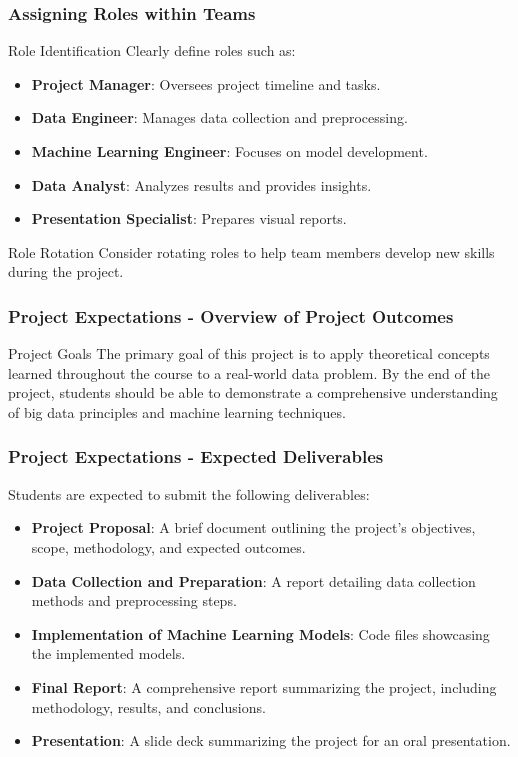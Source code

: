 \documentclass[aspectratio=169]{beamer}
\begin{document}
\begin{frame}[fragile]
    \frametitle{Assigning Roles within Teams}
    \begin{block}{Role Identification}
        Clearly define roles such as:
        \begin{itemize}
            \item \textbf{Project Manager}: Oversees project timeline and tasks.
            \item \textbf{Data Engineer}: Manages data collection and preprocessing.
            \item \textbf{Machine Learning Engineer}: Focuses on model development.
            \item \textbf{Data Analyst}: Analyzes results and provides insights.
            \item \textbf{Presentation Specialist}: Prepares visual reports.
        \end{itemize}
    \end{block}
    \begin{block}{Role Rotation}
        Consider rotating roles to help team members develop new skills during the project.
    \end{block}
\end{frame}

\begin{frame}[fragile]
    \frametitle{Project Expectations - Overview of Project Outcomes}
    \begin{block}{Project Goals}
        The primary goal of this project is to apply theoretical concepts learned throughout the course to a real-world data problem. 
        By the end of the project, students should be able to demonstrate a comprehensive understanding of big data principles and machine learning techniques.
    \end{block}
\end{frame}

\begin{frame}[fragile]
    \frametitle{Project Expectations - Expected Deliverables}
    Students are expected to submit the following deliverables:
    \begin{itemize}
        \item \textbf{Project Proposal}: A brief document outlining the project's objectives, scope, methodology, and expected outcomes.
        \item \textbf{Data Collection and Preparation}: A report detailing data collection methods and preprocessing steps.
        \item \textbf{Implementation of Machine Learning Models}: Code files showcasing the implemented models.
        \item \textbf{Final Report}: A comprehensive report summarizing the project, including methodology, results, and conclusions.
        \item \textbf{Presentation}: A slide deck summarizing the project for an oral presentation.
    \end{itemize}
\end{frame}
\end{document}
